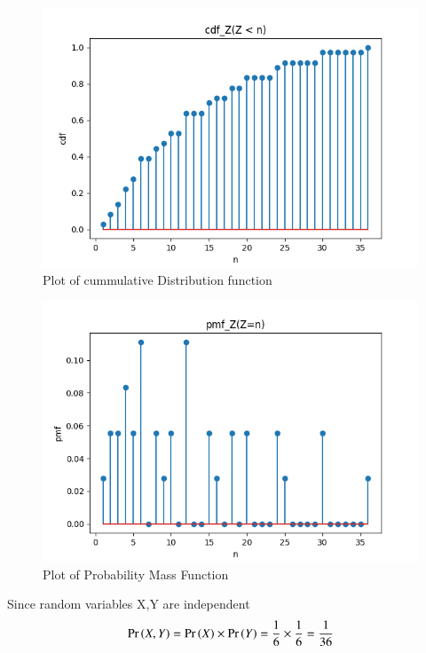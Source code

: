 \documentclass[journal,12pt,twocolumn]{IEEEtran}
\begin{document}
\begin{figure}
				\centering
				\includegraphics[width=\columnwidth]{figs/assign1_6.png}
				\caption{Plot of cummulative Distribution function}
				\label{fig:figure1}
\end{figure}

\begin{figure}
			\centering
			\includegraphics[width=\columnwidth]{figs/assign1_5.png}
			\caption{Plot of Probability Mass Function}
\label{fig:figure2}
\end{figure}

\newpage
Since random variables X,Y are independent 
\begin{align}
\Pr\left(X,Y\right)=\Pr\left(X\right) \times \Pr\left(Y\right)=\frac{1}{6} \times \frac{1}{6}=\frac{1}{36}
\end{align}
\end{document}
